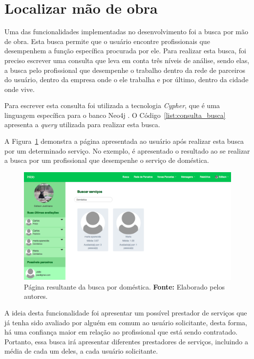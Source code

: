 \section{Localizar mão de obra}

\par Uma das funcionalidades implementadas no desenvolvimento foi a busca por mão de obra. Esta busca permite que o usuário encontre profissionais que desempenhem a função específica procurada por ele. Para realizar esta busca, foi preciso escrever uma consulta que leva em conta três níveis de análise, sendo elas, a busca pelo profissional que desempenhe o trabalho dentro da rede de parceiros do usuário, dentro da empresa onde o ele trabalha e por último, dentro da cidade onde vive.  

\par Para escrever esta consulta foi utilizada a tecnologia \textit{Cypher}, que é uma linguagem específica para o banco Neo4j \cite{neo4j_team_manual}. O Código~\ref{list:consulta_busca} apresenta a \textit{query} utilizada para realizar esta busca.

\par A Figura~\ref{fig:busca_domestica_edilson} demonstra a página apresentada ao usuário após realizar esta busca por um determinado serviço. No exemplo, é apresentado o resultado ao se realizar a busca por um profissional que desempenhe o serviço de doméstica.

\begin{figure}[h!]
	\centerline{\includegraphics[scale=0.3]{./imagens/busca-domestica-edilson.png}}
	\caption[Página resultante da busca por doméstica.]
	{Página resultante da busca por doméstica. \textbf{Fonte:} Elaborado pelos autores.}
	\label{fig:busca_domestica_edilson}
\end{figure}

\par A ideia desta funcionalidade foi apresentar um possível prestador de serviços que já tenha sido avaliado por alguém em comum ao usuário solicitante, desta forma, há uma confiança maior em relação ao profissional que está sendo contratado. Portanto, essa busca irá apresentar diferentes prestadores de serviços, incluindo a média de cada um deles, a cada usuário solicitante.

